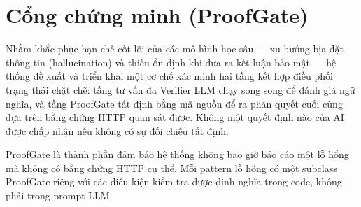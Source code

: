 \section{Cổng chứng minh (ProofGate)}

Nhằm khắc phục hạn chế cốt lõi của các mô hình học sâu --- xu hướng bịa đặt thông tin (hallucination) và thiếu ổn định khi đưa ra kết luận bảo mật --- hệ thống đề xuất và triển khai một cơ chế xác minh hai tầng kết hợp điều phối trạng thái chặt chẽ: tầng tư vấn đa Verifier LLM chạy song song để đánh giá ngữ nghĩa, và tầng ProofGate tất định bằng mã nguồn để ra phán quyết cuối cùng dựa trên bằng chứng HTTP quan sát được. Không một quyết định nào của AI được chấp nhận nếu không có sự đối chiếu tất định.

ProofGate là thành phần đảm bảo hệ thống không bao giờ báo cáo một lỗ hổng mà không có bằng chứng HTTP cụ thể. Mỗi pattern lỗ hổng có một subclass ProofGate riêng với các điều kiện kiểm tra được định nghĩa trong code, không phải trong prompt LLM.

